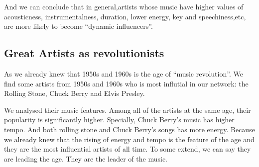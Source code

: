 \documentclass[12pt]{article}
\begin{document}
And we can conclude that in general,artists whose music have higher values of acousticness, instrumentalness, duration, lower energy, key and speechiness,etc, are more likely to become ``dynamic influencers''.


\subsection{Great Artists as revolutionists}\quad\;
As we already knew that 1950s and 1960s is the age of ``music revolution''. We find some artists from 1950s and 1960s who is most influtial in our network: the Rolling Stone, Chuck Berry and Elvis Presley.\par
We analysed their music features. Among all of the artists at the same age, their popularity is significantly higher. Specially, Chuck Berry's music has higher tempo. And both rolling stone and Chuck Berry's songs has more energy. Because we already knew that the rising of energy and tempo is the feature of the age and they are the most influential artists of all time. To some extend, we can say they are leading the age. They are the leader of the music.
\end{document}

